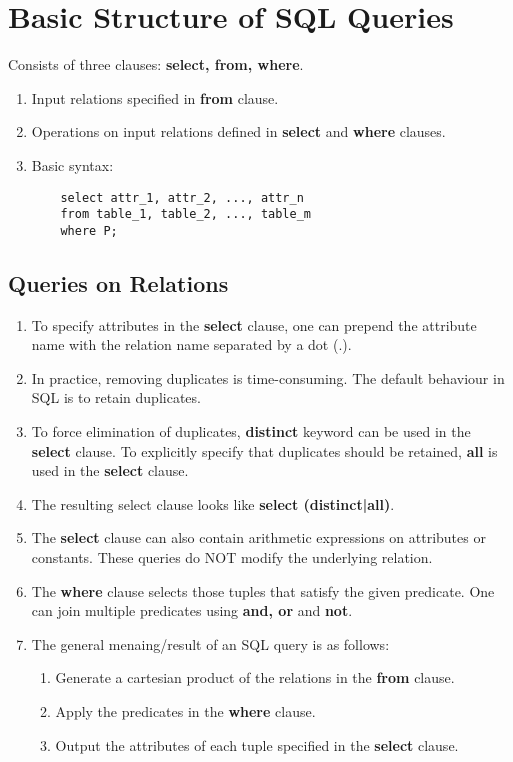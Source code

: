 \documentclass[journal,12pt,twocolumn]{IEEEtran}
\begin{document}
\section{Basic Structure of SQL Queries}

Consists of three clauses: \textbf{select, from, where}.
\begin{enumerate}
    \item Input relations specified in \textbf{from} clause.
    \item Operations on input relations defined in \textbf{select} and 
    \textbf{where} clauses.
    \item Basic syntax:
    \begin{lstlisting}
    select attr_1, attr_2, ..., attr_n
    from table_1, table_2, ..., table_m
    where P;
    \end{lstlisting}
\end{enumerate}

\subsection{Queries on Relations}
\begin{enumerate}
    \item To specify attributes in the \textbf{select} clause, one can prepend 
    the attribute name with the relation name separated by a dot (.).
    \item In practice, removing duplicates is time-consuming. The default 
    behaviour in SQL is to retain duplicates.
    \item To force elimination of duplicates, \textbf{distinct} keyword can be 
    used in the \textbf{select} clause. To explicitly specify that duplicates 
    should be retained, \textbf{all} is used in the \textbf{select} clause.
    \item The resulting select clause looks like \textbf{select (distinct|all)}.
    \item The \textbf{select} clause can also contain arithmetic expressions on 
    attributes or constants. These queries do NOT modify the underlying relation.
    \item The \textbf{where} clause selects those tuples that satisfy the given
    predicate. One can join multiple predicates using \textbf{and, or} and 
    \textbf{not}.
    \item The general menaing/result of an SQL query is as follows:
    \begin{enumerate}
        \item Generate a cartesian product of the relations in the \textbf{from} 
        clause.
        \item Apply the predicates in the \textbf{where} clause.
        \item Output the attributes of each tuple specified in the \textbf{select}
        clause.
    \end{enumerate}
\end{enumerate}
\end{document}

